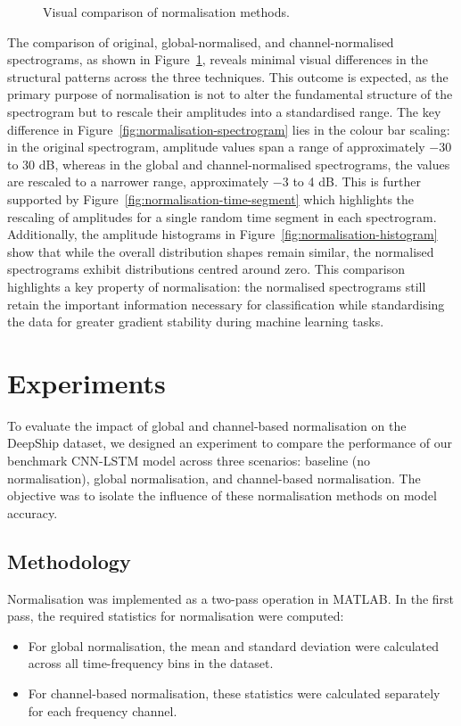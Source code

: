 \begin{figure}[htbp]
    \caption{Visual comparison of normalisation methods.}
    \label{fig:normalisation-combined}
\end{figure}

The comparison of original, global-normalised, and channel-normalised spectrograms, as shown in Figure~\ref{fig:normalisation-combined}, reveals minimal visual differences in the structural patterns across the three techniques. This outcome is expected, as the primary purpose of normalisation is not to alter the fundamental structure of the spectrogram but to rescale their amplitudes into a standardised range. The key difference in Figure~\ref{fig:normalisation-spectrogram} lies in the colour bar scaling: in the original spectrogram, amplitude values span a range of approximately $-30$ to 30 dB, whereas in the global and channel-normalised spectrograms, the values are rescaled to a narrower range, approximately $-3$ to 4 dB. This is further supported by Figure~\ref{fig:normalisation-time-segment} which highlights the rescaling of amplitudes for a single random time segment in each spectrogram. Additionally, the amplitude histograms in Figure~\ref{fig:normalisation-histogram} show that while the overall distribution shapes remain similar, the normalised spectrograms exhibit distributions centred around zero. This comparison highlights a key property of normalisation: the normalised spectrograms still retain the important information necessary for classification while standardising the data for greater gradient stability during machine learning tasks.

\section{Experiments}

To evaluate the impact of global and channel-based normalisation on the DeepShip dataset, we designed an experiment to compare the performance of our benchmark CNN-LSTM model across three scenarios: baseline (no normalisation), global normalisation, and channel-based normalisation. The objective was to isolate the influence of these normalisation methods on model accuracy.

\subsection{Methodology}

Normalisation was implemented as a two-pass operation in MATLAB. In the first pass, the required statistics for normalisation were computed:
\begin{itemize}
    \item For global normalisation, the mean and standard deviation were calculated across all time-frequency bins in the dataset.
    \item For channel-based normalisation, these statistics were calculated separately for each frequency channel. 
\end{itemize}

